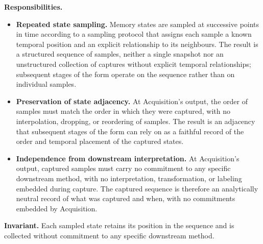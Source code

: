   \textbf{Responsibilities.}
  \begin{itemize}
    \item \textbf{Repeated state sampling.} Memory states are sampled at successive points in time according to a sampling protocol that assigns each sample a known temporal position and an explicit relationship to its neighbours. The result is a structured sequence of samples, neither a single snapshot nor an unstructured collection of captures without explicit temporal relationships; subsequent stages of the form operate on the sequence rather than on individual samples.
    \item \textbf{Preservation of state adjacency.} At Acquisition's output, the order of samples must match the order in which they were captured, with no interpolation, dropping, or reordering of samples. The result is an adjacency that subsequent stages of the form can rely on as a faithful record of the order and temporal placement of the captured states.
    \item \textbf{Independence from downstream interpretation.} At Acquisition's output, captured samples must carry no commitment to any specific downstream method, with no interpretation, transformation, or labeling embedded during capture. The captured sequence is therefore an analytically neutral record of what was captured and when, with no commitments embedded by Acquisition.
  \end{itemize}

  \textbf{Invariant.} Each sampled state retains its position in the sequence and is collected without commitment to any specific downstream method.

